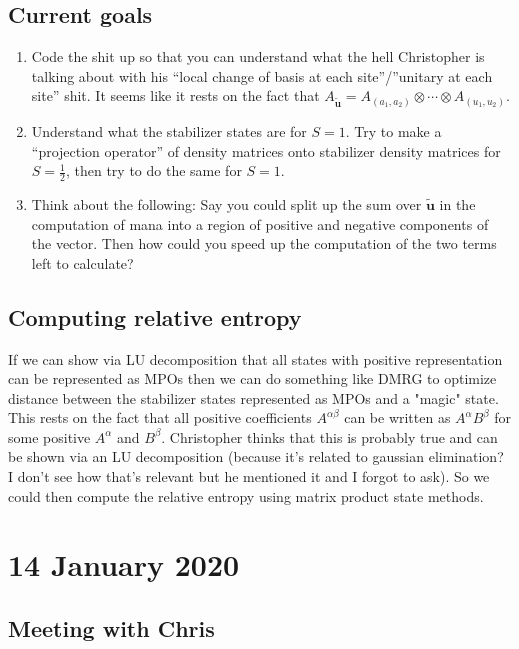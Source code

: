 \documentclass{report}
\begin{document}
 \section{Current goals}
 \begin{enumerate}
 \item Code the shit up so that you can understand what the hell Christopher is talking about with his ``local change of basis at each site''/''unitary at each site'' shit. It seems like it rests on the fact that $A_{\tilde{\bm u}}=A_{(a_1,a_2)}\otimes\cdots\otimes A_{(u_1,u_2)}$.
 \item Understand what the stabilizer states are for $S=1$. Try to make a ``projection operator'' of density matrices onto stabilizer density matrices for $S=\frac{1}{2}$, then try to do the same for $S=1$.
 \item Think about the following: Say you could split up the sum over $\tilde{\bm u}$ in the computation of mana into a region of positive and negative components of the vector. Then how could you speed up the computation of the two terms left to calculate?
 \end{enumerate}

 \section{Computing relative entropy}
 If we can show via LU decomposition that all states with positive representation can be represented as MPOs then we can do something like DMRG to optimize distance between the stabilizer states represented as MPOs and a "magic" state. This rests on the fact that all positive coefficients $A^{\alpha\beta}$ can be written as $A^\alpha B^\beta$ for some positive $A^\alpha$ and $B^\beta$. Christopher thinks that this is probably true and can be shown via an LU decomposition (because it's related to gaussian elimination? I don't see how that's relevant but he mentioned it and I forgot to ask). So we could then compute the relative entropy using matrix product state methods.
 
 \chapter{14 January 2020}
 
 \section{Meeting with Chris}
 
\end{document}
